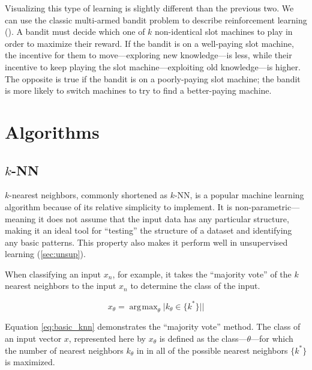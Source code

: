 \documentclass{comjnl}
\newcommand{\abs}[1]{\lvert #1 \rvert|}
\DeclareMathOperator*{\argmax}{\arg\!\max}
\numberwithin{equation}{subsection}
\begin{document}
            Visualizing this type of learning is slightly different than the previous two. We can
            use the classic multi-armed bandit problem to describe reinforcement learning
            (\cite{auerp}). A bandit must decide which one of $k$ non-identical slot machines to
            play in order to maximize their reward. If the bandit is on a well-paying slot machine,
            the incentive for them to move---exploring new knowledge---is less, while their incentive
            to keep playing the slot machine---exploiting old knowledge---is higher. The opposite is
            true if the bandit is on a poorly-paying slot machine; the bandit is more likely to
            switch machines to try to find a better-paying machine.


    \section{Algorithms}\label{sec:alg}

        \subsection{$k$-NN}\label{subsec:knn}

            $k$-nearest neighbors, commonly shortened as $k$-NN, is a popular machine learning
            algorithm because of its relative simplicity to implement. It is non-parametric---
            meaning it does not assume that the input data has any particular structure, making it
            an ideal tool for ``testing'' the structure of a dataset and identifying any basic
            patterns. This property also makes it perform well in unsupervised learning
            (\ref{sec:unsup}).

            When classifying an input $x_n$, for example, it takes the ``majority vote'' of the $k$
            nearest neighbors to the input $x_n$ to determine the class of the input. 

            \begin{equation}\label{eq:basic_knn}
                x_{\theta}=\argmax_{\theta} \abs{k_{\theta} \in \{k^*\}}
            \end{equation}

            \noindent Equation \eqref{eq:basic_knn} demonstrates the ``majority vote'' method.
            The class of an input vector $x$, represented here by $x_{\theta}$ is defined as the
            class---$\theta$---for which the number of nearest neighbors $k_{\theta}$ in in all of
            the possible nearest neighbors $\{k^*\}$ is maximized.
\end{document}
